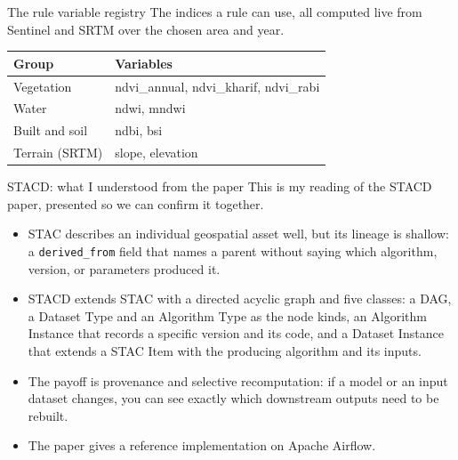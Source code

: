 \documentclass[aspectratio=169]{beamer}
\begin{document}
\begin{frame}{The rule variable registry}
The indices a rule can use, all computed live from Sentinel and SRTM over the chosen area and year.

\vspace{3mm}
\begin{center}
\begin{tabular}{ll}
\toprule
Group & Variables \\
\midrule
Vegetation & ndvi\_annual, ndvi\_kharif, ndvi\_rabi \\
Water & ndwi, mndwi \\
Built and soil & ndbi, bsi \\
Terrain (SRTM) & slope, elevation \\
\bottomrule
\end{tabular}
\end{center}
\end{frame}

\begin{frame}{STACD: what I understood from the paper}
This is my reading of the STACD paper, presented so we can confirm it together.
\begin{itemize}\small
  \item STAC describes an individual geospatial asset well, but its lineage is shallow: a
  \texttt{derived\_from} field that names a parent without saying which algorithm, version, or
  parameters produced it.
  \item STACD extends STAC with a directed acyclic graph and five classes: a DAG, a Dataset Type
  and an Algorithm Type as the node kinds, an Algorithm Instance that records a specific version and
  its code, and a Dataset Instance that extends a STAC Item with the producing algorithm and its
  inputs.
  \item The payoff is provenance and selective recomputation: if a model or an input dataset
  changes, you can see exactly which downstream outputs need to be rebuilt.
  \item The paper gives a reference implementation on Apache Airflow.
\end{itemize}
\end{frame}
\end{document}

